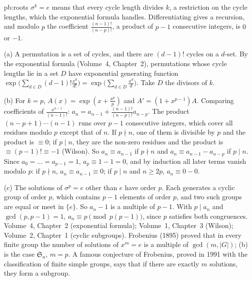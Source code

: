 \begin{solution}{pb:roots}
\idea $\sigma^k=e$ means that every cycle length divides $k$, a restriction on the cycle lengths, which the exponential formula
handles. Differentiating gives a recursion, and modulo $p$ the coefficient $\frac{(n-1)!}{(n-p)!}$, a product of $p-1$
consecutive integers, is $0$ or $-1$.

\writeup (a) A permutation is a set of cycles, and there are $(d-1)!$ cycles on a $d$-set. By the exponential formula
(Volume~4, Chapter~2), permutations whose cycle lengths lie in a set $D$ have exponential generating function
$\exp\bigl(\sum_{d\in D}(d-1)!\frac{x^d}{d!}\bigr)=\exp\bigl(\sum_{d\in D}\frac{x^d}d\bigr)$. Take $D$ the divisors of $k$.

(b) For $k=p$, $A(x)=\exp(x+\frac{x^p}p)$ and $A'=(1+x^{p-1})A$. Comparing coefficients of $\frac{x^{n-1}}{(n-1)!}$:
$a_n=a_{n-1}+\frac{(n-1)!}{(n-p)!}a_{n-p}$. The product $(n-p+1)\cdots(n-1)$ runs over $p-1$ consecutive integers, which cover all
residues modulo $p$ except that of $n$. If $p\nmid n$, one of them is divisible by $p$ and the product is $\equiv0$; if $p\mid n$,
they are the non-zero residues and the product is $\equiv(p-1)!\equiv-1$ (Wilson). So $a_n\equiv a_{n-1}$ if $p\nmid n$ and
$a_n\equiv a_{n-1}-a_{n-p}$ if $p\mid n$. Since $a_0=\dots=a_{p-1}=1$, $a_p\equiv1-1=0$, and by induction all later terms vanish
modulo $p$: if $p\nmid n$, $a_n\equiv a_{n-1}\equiv0$; if $p\mid n$ and $n\ge2p$, $a_n\equiv0-0$.

(c) The solutions of $\sigma^p=e$ other than $e$ have order $p$. Each generates a cyclic group of order $p$, which contains
$p-1$ elements of order $p$, and two such groups are equal or meet in $\{e\}$. So $a_n-1$ is a multiple of $p-1$. With
$p\mid a_n$ and $\gcd(p,p-1)=1$, $a_n\equiv p\pmod{p(p-1)}$, since $p$ satisfies both congruences.
\tools Volume~4, Chapter~2 (exponential formula); Volume~1, Chapter~3 (Wilson); Volume~2, Chapter~1 (cyclic subgroups).
\leads Frobenius (1895) proved that in every finite group the number of solutions of $x^m=e$ is a multiple of
$\gcd(m,|G|)$; (b) is the case $\mathfrak S_n$, $m=p$. A famous conjecture of Frobenius, proved in 1991 with the
classification of finite simple groups, says that if there are exactly $m$ solutions, they form a subgroup.
\end{solution}

